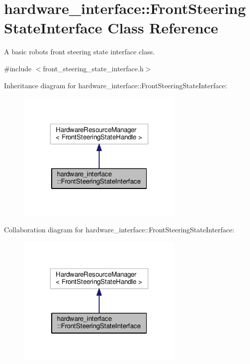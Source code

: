\hypertarget{classhardware__interface_1_1FrontSteeringStateInterface}{}\section{hardware\+\_\+interface\+:\+:Front\+Steering\+State\+Interface Class Reference}
\label{classhardware__interface_1_1FrontSteeringStateInterface}


A basic robot\textquotesingle{}s front steering state interface class.  




{\ttfamily \#include $<$front\+\_\+steering\+\_\+state\+\_\+interface.\+h$>$}



Inheritance diagram for hardware\+\_\+interface\+:\+:Front\+Steering\+State\+Interface\+:\nopagebreak
\begin{figure}[H]
\begin{center}
\leavevmode
\includegraphics[width=227pt]{classhardware__interface_1_1FrontSteeringStateInterface__inherit__graph}
\end{center}
\end{figure}


Collaboration diagram for hardware\+\_\+interface\+:\+:Front\+Steering\+State\+Interface\+:\nopagebreak
\begin{figure}[H]
\begin{center}
\leavevmode
\includegraphics[width=227pt]{classhardware__interface_1_1FrontSteeringStateInterface__coll__graph}
\end{center}
\end{figure}


